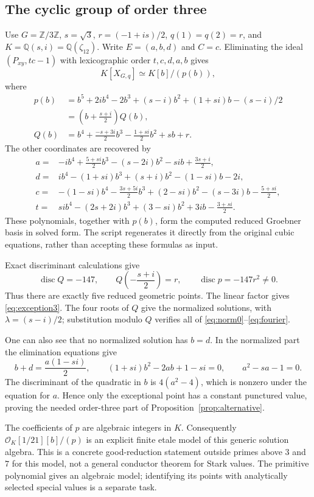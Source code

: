 \documentclass[11pt]{article}
\theoremstyle{remark}
\newcommand{\Q}{\mathbb Q}
\newcommand{\Z}{\mathbb Z}
\newcommand{\disc}{\operatorname{disc}}
\begin{document}
\subsection{The cyclic group of order three}
Use $G=\Z/3\Z$, $s=\sqrt3$, $r=(-1+is)/2$, $q(1)=q(2)=r$, and
$K=\Q(s,i)=\Q(\zeta_{12})$. Write $E=(a,b,d)$ and $C=c$.
Eliminating the ideal $(P_{xy},tc-1)$ with lexicographic order
$t,c,d,a,b$ gives
\[
 K[X_{G,q}]\simeq K[b]/(p(b)),
\]
where
\begin{align*}
 p(b)&=b^5+2ib^4-2b^3+(s-i)b^2+(1+si)b-(s-i)/2\\
 &=\left(b+\frac{s+i}{2}\right)Q(b),\\
 Q(b)&=b^4+\frac{-s+3i}{2}b^3-\frac{1+si}{2}b^2+sb+r.
\end{align*}
The other coordinates are recovered by
\begin{align*}
 a={}&-ib^4+\frac{5+si}{2}b^3-(s-2i)b^2-si b+\frac{3s+i}{2},\\
 d={}&ib^4-(1+si)b^3+(s+i)b^2-(1-si)b-2i,\\
 c={}&-(1-si)b^4-\frac{3s+5i}{2}b^3+(2-si)b^2-(s-3i)b-\frac{5+si}{2},\\
 t={}&si b^4-(2s+2i)b^3+(3-si)b^2+3ib-\frac{3+si}{2}.
\end{align*}
These polynomials, together with $p(b)$, form the computed reduced Groebner
basis in solved form. The script regenerates it directly from the original
cubic equations, rather than accepting these formulas as input.

Exact discriminant calculations give
\[
 \disc Q=-147,
 \qquad Q\left(-\frac{s+i}{2}\right)=r,
 \qquad \disc p=-147r^2\ne0.
\]
Thus there are exactly five reduced geometric points. The linear factor gives
\eqref{eq:exception3}. The four roots of $Q$ give the normalized solutions,
with $\lambda=(s-i)/2$; substitution modulo $Q$ verifies all of
\eqref{eq:norm0}--\eqref{eq:fourier}.

One can also see that no normalized solution has $b=d$.
In the normalized part the elimination equations give
\[
 b+d=\frac{a(1-si)}2,
 \qquad (1+si)b^2-2ab+1-si=0,
 \qquad a^2-sa-1=0.
\]
The discriminant of the quadratic in $b$ is $4(a^2-4)$, which is nonzero under
the equation for $a$. Hence only the exceptional point has a constant
punctured value, proving the needed order-three part of
Proposition~\ref{prop:alternative}.

The coefficients of $p$ are algebraic integers in $K$. Consequently
$\mathcal O_K[1/21][b]/(p)$ is an explicit finite etale model of this generic
solution algebra. This is a concrete good-reduction statement outside primes
above $3$ and $7$ for this model, not a general conductor theorem for Stark
values. The primitive polynomial gives an algebraic model; identifying its
points with analytically selected special values is a separate task.
\end{document}

